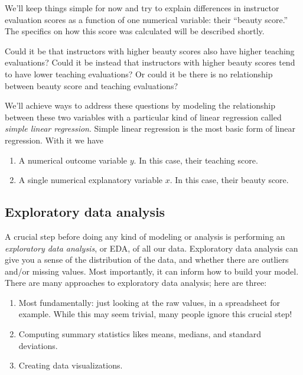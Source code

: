 \documentclass[12pt,]{krantz}
\providecommand{\tightlist}{%
  \setlength{\itemsep}{0pt}\setlength{\parskip}{0pt}}
\theoremstyle{definition}
\theoremstyle{definition}
\theoremstyle{definition}
\theoremstyle{remark}
\begin{document}
We'll keep things simple for now and try to explain differences in
instructor evaluation scores as a function of one numerical variable:
their ``beauty score.'' The specifics on how this score was calculated
will be described shortly.

Could it be that instructors with higher beauty scores also have higher
teaching evaluations? Could it be instead that instructors with higher
beauty scores tend to have lower teaching evaluations? Or could it be
there is no relationship between beauty score and teaching evaluations?

We'll achieve ways to address these questions by modeling the
relationship between these two variables with a particular kind of
linear regression called \emph{simple linear regression}. Simple linear
regression is the most basic form of linear regression. With it we have

\begin{enumerate}
\def\labelenumi{\arabic{enumi}.}
\tightlist
\item
  A numerical outcome variable \(y\). In this case, their teaching
  score.
\item
  A single numerical explanatory variable \(x\). In this case, their
  beauty score.
\end{enumerate}

\subsection{Exploratory data analysis}\label{model1EDA}

A crucial step before doing any kind of modeling or analysis is
performing an \emph{exploratory data analysis}, or EDA, of all our data.
Exploratory data analysis can give you a sense of the distribution of
the data, and whether there are outliers and/or missing values. Most
importantly, it can inform how to build your model. There are many
approaches to exploratory data analysis; here are three:

\begin{enumerate}
\def\labelenumi{\arabic{enumi}.}
\tightlist
\item
  Most fundamentally: just looking at the raw values, in a spreadsheet
  for example. While this may seem trivial, many people ignore this
  crucial step!
\item
  Computing summary statistics likes means, medians, and standard
  deviations.
\item
  Creating data visualizations.
\end{enumerate}
\end{document}
